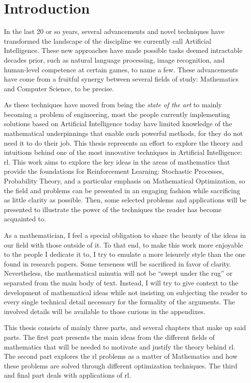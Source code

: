\chapter*{Introduction}
\label{chapter:Intro}

In the last 20 or so years, several advancements and novel techniques have
transformed the landscape of the discipline we currently call Artificial
Intelligence. These new approaches have made possible tasks deemed intractable
decades prior, such as natural language processing, image recognition, and
human-level competence at certain games, to name a few. These advancements have
come from a fruitful synergy between several fields of study: Mathematics and
Computer Science, to be precise.

As these techniques have moved from being the \textit{state of the art} to
mainly becoming a problem of engineering, most the people currently implementing
solutions based on Artificial Intelligence today have limited knowledge of the
mathematical underpinnings that enable such powerful methods, for they do not 
need it to do their job. This thesis represents an effort to explore the theory
and intuitions behind one of the most innovative techniques in Artificial
Intelligence: \ac{rl}. This work aims to explore the key ideas in
the areas of mathematics that provide the foundations for Reinforcement
Learning: Stochastic Processes, Probability Theory, and a particular emphasis on
Mathematical Optimization, so the field and problems can be presented in an
engaging fashion while sacrificing as little clarity as possible. Then, some 
selected problems and applications will be presented to illustrate the power of
the techniques the reader has become acquainted to. 

As a mathematician, I feel a special obligation to share the beauty of the ideas
in our field with those outside of it. To that end, to make this work more
enjoyable to the people I dedicate it to, I try to emulate a more leisurely
style than the one found in research papers.  Some terseness will be sacrificed
in favor of clarity. Nevertheless, the mathematical minutia will not be ``swept
under the rug'' or separated from the main body of text. Instead, I will try to
give context to the development of mathematical ideas while not insisting on
subjecting the reader to every single technical detail necessary for the
formality of the arguments. The involved details will be available to those
curious in the appendixes.

This thesis consists of mainly three parts, and several chapters that make up
said parts. The first part presents the main ideas from the different fields of
mathematics that will be needed to motivate and justify the theory behind
\ac{rl}. The second part explores the \ac{rl}
problems as a matter of Mathematics and how these problems are solved through
different optimization techniques. The third and final part deals with
applications of \ac{rl}.

